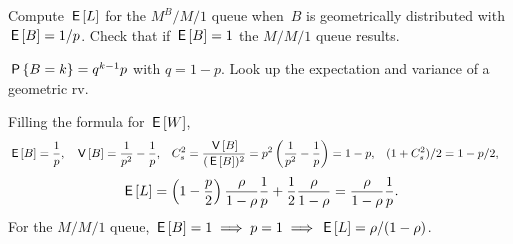 \documentclass[stochastic-or.tex]{subfiles}
\begin{document}
\begin{exercise}\label{ex:l-168}
Compute $\E\L$ for the $M^{B}/M/1$ queue when~$B$ is geometrically distributed with $\E B = 1/p$.
Check that if $\E B =1$ the $M/M/1$ queue results.
\begin{hint}
$\P{B=k}=q^{k-1}p$ with $q=1-p$. Look up the expectation and variance of a geometric rv.
\end{hint}
\begin{solution}
Filling the formula for $\E W$,
 \begin{align*}
 \E B &= \frac 1 p, &  \V B &= \frac1{p^2}-\frac1p, &  C_s^2&= \frac{\V B}{(\E B)^2} = p^2 \left(\frac1{p^2}-\frac1p\right)=1-p, &
 (1+C_s^2)/2 &= 1-p/2,
\end{align*}
\begin{equation*}
\E \L =
\left(1-\frac p2\right) \frac\rho{1-\rho} \frac 1 p + \frac12\frac\rho{1-\rho}
=\frac\rho{1-\rho} \frac 1 p.
\end{equation*}
For the $M/M/1$ queue, $\E B = 1 \implies p = 1 \implies \E\L=\rho/(1-\rho)$.

\end{solution}
\end{exercise}
\end{document}
